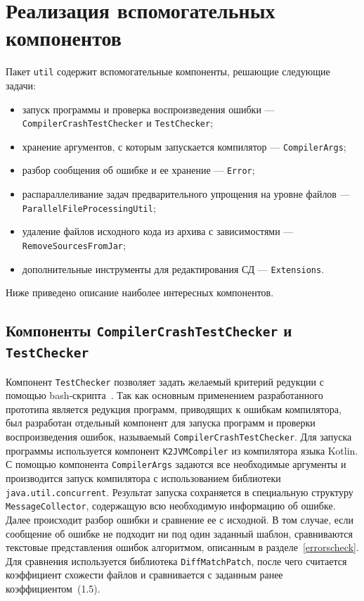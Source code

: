 \section{Реализация вспомогательных компонентов}
Пакет \texttt{util} содержит вспомогательные компоненты, решающие следующие задачи:
\begin{itemize}
	\item запуск программы и проверка воспроизведения ошибки --- \texttt{CompilerCrashTestChecker} и \texttt{TestChecker};
	\item хранение аргументов, с которым запускается компилятор --- \texttt{CompilerArgs};
	\item разбор сообщения об ошибке и ее хранение --- \texttt{Error};
	\item распараллеливание задач предварительного упрощения на уровне файлов --- \texttt{ParallelFileProcessingUtil};
	\item удаление файлов исходного кода из архива с зависимостями --- \texttt{RemoveSourcesFromJar};
	\item дополнительные инструменты для редактирования СД --- \texttt{Extensions}.
\end{itemize}
Ниже приведено описание наиболее интересных компонентов.

\subsection{Компоненты \texttt{CompilerCrashTestChecker} и \texttt{TestChecker}}
Компонент \texttt{TestChecker} позволяет задать желаемый критерий редукции с помощью bash-скрипта~\cite{blum2008linux}. Так как основным применением разработанного прототипа является редукция программ, приводящих к ошибкам компилятора, был разработан отдельный компонент для запуска программ и проверки воспроизведения ошибок, называемый \texttt{CompilerCrashTestChecker}. Для запуска программы используется компонент \texttt{K2JVMCompiler} из компилятора языка Kotlin. С помощью компонента \texttt{CompilerArgs} задаются все необходимые аргументы и производится запуск компилятора с использованием библиотеки \texttt{java.util.concurrent}. Результат запуска сохраняется в специальную структуру \texttt{MessageCollector}, содержащую всю необходимую информацию об ошибке. Далее происходит разбор ошибки и сравнение ее с исходной. В том случае, если сообщение об ошибке не подходит ни под один заданный шаблон, сравниваются текстовые представления ошибок алгоритмом, описанным в разделе~\ref{errorscheck}. Для сравнения используется библиотека \texttt{DiffMatchPatch}, после чего считается коэффициент схожести файлов и сравнивается с заданным ранее коэффициентом~(1.5).

